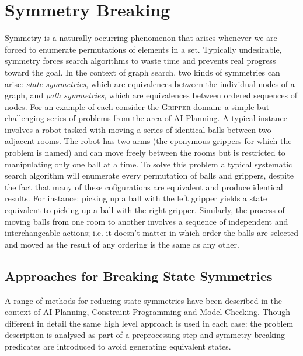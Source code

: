 \section{Symmetry Breaking}
\label{cha::lit::symmetry}
Symmetry is a naturally occurring phenomenon that arises whenever we are forced
to enumerate permutations of elements in a set. Typically
undesirable, symmetry forces search algorithms to waste time and prevents real 
progress toward the goal.
In the context of graph search, two kinds of symmetries can arise: \emph{state
symmetries}, which are equivalences between the individual nodes of a graph,
and \emph{path symmetries}, which are equivalences between ordered sequences of
nodes.
For an example of each consider the \textsc{Gripper} domain: a simple
but challenging series of problems from the area of AI Planning. A typical instance
involves a robot tasked with moving a series of identical balls between two adjacent rooms.
The robot has two arms (the eponymous grippers for which the problem is named) and can
move freely between the rooms but is restricted to manipulating only one
ball at a time.
To solve this problem a typical systematic search algorithm will enumerate every 
permutation of balls and grippers, despite the fact that many of these cofigurations
are equivalent and produce identical results. For instance: picking up a ball with 
the left gripper yields a state equivalent to picking up a ball with the right gripper.
 Similarly, the process of moving balls from one room to another involves a sequence of
independent and interchangeable actions; i.e. it doesn't matter in which order 
the balls are selected and moved as the result of any ordering is the same as any other.

\subsection{Approaches for Breaking State Symmetries}

A range of methods for reducing state symmetries have been described in the 
context of AI Planning, Constraint Programming and Model Checking. Though different in detail
the same high level approach is used in each case: the problem description is analysed
as part of a preprocessing step and symmetry-breaking predicates are introduced 
to avoid generating equivalent states.

